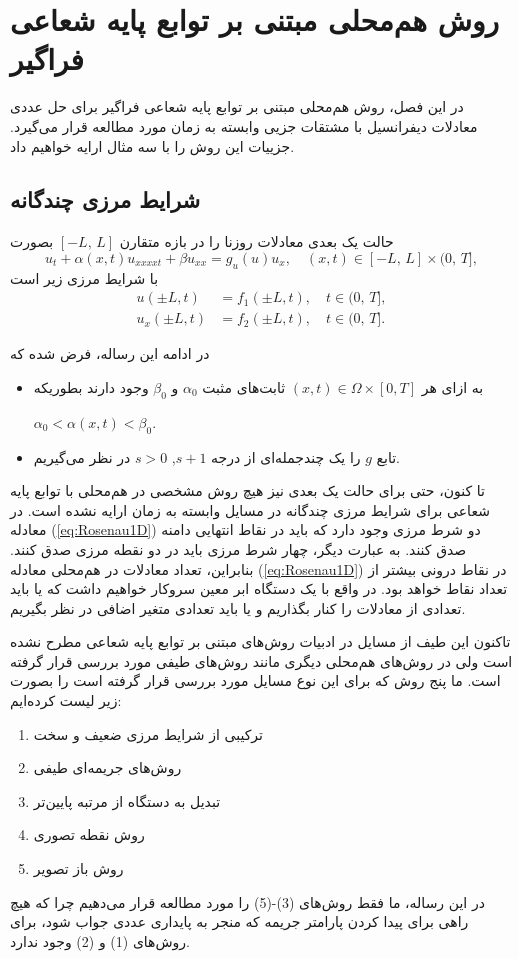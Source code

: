 
\chapter{روش هم‌محلی مبتنی بر توابع پایه شعاعی فراگیر  }\label{se:grbf}
%

در این فصل، روش هم‌محلی مبتنی بر توابع پایه شعاعی فراگیر برای حل عددی معادلات دیفرانسیل با مشتقات جزیی وابسته به زمان مورد مطالعه قرار می‌گیرد. جزییات این روش را با سه مثال ارایه خواهیم داد.



\section{شرایط مرزی چندگانه}
حالت یک بعدی معادلات روزنا را در بازه متقارن 
$[-L,\,L]$ 
بصورت
\begin{equation}
u_t+\alpha(x,t)u_{xxxxt}+\beta u_{xx}= g_u(u)u_x,\quad(x,t)\in
[-L,\,L]\times(0,\,T], \label{eq:Rosenau1D}
\end{equation}
با شرایط مرزی زیر است
\begin{align}
u(\pm L,t)&=f_1(\pm L,t),\quad t\in (0,\,T],\\
u_x(\pm L,t)&=f_2(\pm L,t),\quad t\in (0,\,T].\label{eq:1Dic}
\end{align}

در ادامه این رساله، فرض شده که
\begin{itemize}
\item
به ازای هر
$(x,t)\in\Omega\times[0,T]$
ثابت‌های مثبت
$\alpha_0$
و
$\beta_0$
وجود دارند بطوریکه

$\alpha_0<\alpha(x,t)<\beta_0$.

\item 
تابع $g$ را یک چندجمله‌ای از درجه 
$s+1$, $s>0$
در نظر می‌گیریم.
\end{itemize}
تا کنون، حتی برای حالت یک بعدی نیز هیچ روش مشخصی در هم‌محلی با توابع پایه شعاعی برای شرایط مرزی چندگانه در مسایل وابسته به زمان ارایه نشده است. در معادله
(\ref{eq:Rosenau1D})
دو شرط مرزی وجود دارد که باید در نقاط انتهایی دامنه صدق کنند. به عبارت دیگر، چهار شرط مرزی باید در دو نقطه مرزی صدق کنند. بنابراین، تعداد معادلات در هم‌محلی معادله 
(\ref{eq:Rosenau1D})
 در نقاط درونی بیشتر از تعداد نقاط خواهد بود. در واقع با یک دستگاه ابر معین سروکار خواهیم داشت که یا باید تعدادی از معادلات را کنار بگذاریم و یا باید تعدادی متغیر اضافی در نظر بگیریم.

تاکنون این طیف از مسایل در ادبیات روش‌های مبتنی بر توابع پایه شعاعی مطرح نشده است ولی در روش‌های هم‌محلی دیگری مانند روش‌های طیفی مورد بررسی قرار گرفته است. ما پنج روش که برای این نوع مسایل مورد بررسی قرار گرفته است را بصورت زیر لیست کرده‌ایم:
\begin{enumerate}
\item ترکیبی از شرایط مرزی ضعیف و سخت 
\item روش‌های جریمه‌ای طیفی 
\item تبدیل به دستگاه از مرتبه پایین‌تر 
\item روش نقطه تصوری
\item روش باز تصویر
\end{enumerate}
در این رساله، ما فقط روش‌های (3)-(5) را مورد مطالعه قرار می‌دهیم چرا که هیچ راهی برای پیدا کردن پارامتر جریمه که منجر به پایداری عددی جواب شود، برای روش‌های (1) و (2) وجود ندارد.

